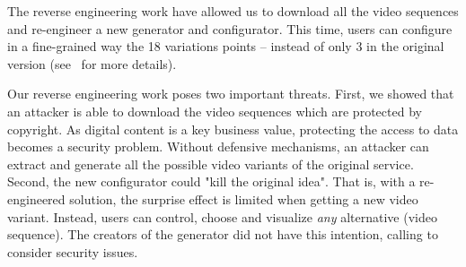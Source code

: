 %



The reverse engineering work have allowed us to download all the video sequences and re-engineer a new generator and configurator. This time, users can configure in a fine-grained way the 18 variations points -- instead of only 3 in the original version (see~\cite{BrefVamos14} for more details). 

Our reverse engineering work poses two important threats. 
First, we showed that an attacker is able to download the video sequences which are protected by copyright. As digital content is a key business value, protecting the access to data becomes a security problem. Without defensive mechanisms, an attacker can extract and generate all the possible video variants of the original service. 
Second, the new configurator could "kill the original idea". That is, with a re-engineered solution, the surprise effect is limited when getting a new video variant. Instead, users can control, choose and visualize \emph{any} alternative (video sequence). The creators of the generator did not have this intention, calling to consider security issues. %


